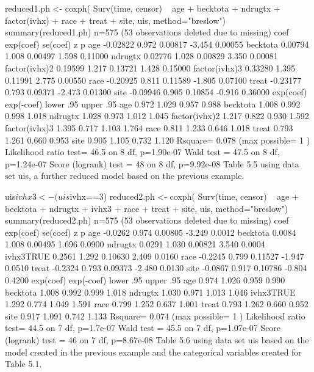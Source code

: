 reduced1.ph <- coxph( Surv(time, censor) ~ age + becktota + ndrugtx +
                      factor(ivhx) + race + treat + site, uis, method="breslow")
summary(reduced1.ph)
  n=575 (53 observations deleted due to missing)
                  coef exp(coef) se(coef)      z       p
age           -0.02822     0.972  0.00817 -3.454 0.00055
becktota       0.00794     1.008  0.00497  1.598 0.11000
ndrugtx        0.02776     1.028  0.00829  3.350 0.00081
factor(ivhx)2  0.19599     1.217  0.13721  1.428 0.15000
factor(ivhx)3  0.33280     1.395  0.11991  2.775 0.00550
race          -0.20925     0.811  0.11589 -1.805 0.07100
treat         -0.23177     0.793  0.09371 -2.473 0.01300
site          -0.09946     0.905  0.10854 -0.916 0.36000
              exp(coef) exp(-coef) lower .95 upper .95
age               0.972      1.029     0.957     0.988
becktota          1.008      0.992     0.998     1.018
ndrugtx           1.028      0.973     1.012     1.045
factor(ivhx)2     1.217      0.822     0.930     1.592
factor(ivhx)3     1.395      0.717     1.103     1.764
race              0.811      1.233     0.646     1.018
treat             0.793      1.261     0.660     0.953
site              0.905      1.105     0.732     1.120
Rsquare= 0.078   (max possible= 1 )
Likelihood ratio test= 46.5  on 8 df,   p=1.90e-07
Wald test            = 47.5  on 8 df,   p=1.24e-07
Score (logrank) test = 48    on 8 df,   p=9.92e-08
Table 5.5 using data set uis, a further reduced model based on the previous example.

uis$ivhx3<-(uis$ivhx==3)
reduced2.ph <- coxph( Surv(time, censor) ~ age + becktota + ndrugtx + 
                      ivhx3 + race + treat + site,  uis, method="breslow")
summary(reduced2.ph)
  n=575 (53 observations deleted due to missing)
             coef exp(coef) se(coef)      z      p
age       -0.0262     0.974  0.00805 -3.249 0.0012
becktota   0.0084     1.008  0.00495  1.696 0.0900
ndrugtx    0.0291     1.030  0.00821  3.540 0.0004
ivhx3TRUE  0.2561     1.292  0.10630  2.409 0.0160
race      -0.2245     0.799  0.11527 -1.947 0.0510
treat     -0.2324     0.793  0.09373 -2.480 0.0130
site      -0.0867     0.917  0.10786 -0.804 0.4200
          exp(coef) exp(-coef) lower .95 upper .95
age           0.974      1.026     0.959     0.990
becktota      1.008      0.992     0.999     1.018
ndrugtx       1.030      0.971     1.013     1.046
ivhx3TRUE     1.292      0.774     1.049     1.591
race          0.799      1.252     0.637     1.001
treat         0.793      1.262     0.660     0.952
site          0.917      1.091     0.742     1.133
Rsquare= 0.074   (max possible= 1 )
Likelihood ratio test= 44.5  on 7 df,   p=1.7e-07
Wald test            = 45.5  on 7 df,   p=1.07e-07
Score (logrank) test = 46    on 7 df,   p=8.67e-08
Table 5.6 using data set uis based on the model created in the previous example and the categorical variables created for Table 5.1.

